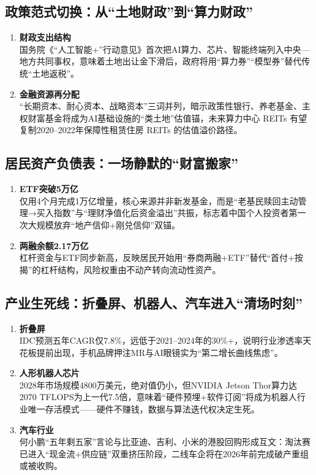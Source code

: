 \subsection{政策范式切换：从“土地财政”到“算力财政”}
\begin{enumerate}[leftmargin=*, nosep]
    \item \textbf{财政支出结构}  \\
    国务院《“人工智能+”行动意见》首次把AI算力、芯片、智能终端列入中央—地方共同事权，意味着土地出让金下滑后，政府将用“算力券”“模型券”替代传统“土地返税”。  
    \item \textbf{金融资源再分配}  \\
    “长期资本、耐心资本、战略资本”三词并列，暗示政策性银行、养老基金、主权财富基金将成为AI基础设施的“类土地”估值锚，未来算力中心 REITs 有望复制2020–2022年保障性租赁住房 REITs 的估值溢价路径。
\end{enumerate}

\subsection{居民资产负债表：一场静默的“财富搬家”}
\begin{enumerate}[leftmargin=*, nosep]
    \item \textbf{ETF突破5万亿}  \\
    仅用4个月完成1万亿增量，核心来源并非新发基金，而是“老基民赎回主动管理→买入指数”与“理财净值化后资金溢出”共振，标志着中国个人投资者第一次大规模放弃“地产信仰+刚兑信仰”双锚。  
    \item \textbf{两融余额2.17万亿}  \\
    杠杆资金与ETF同步新高，反映居民开始用“券商两融+ETF”替代“首付+按揭”的杠杆结构，风险权重由不动产转向流动性资产。
\end{enumerate}

\subsection{产业生死线：折叠屏、机器人、汽车进入“清场时刻”}
\begin{enumerate}[leftmargin=*, nosep]
    \item \textbf{折叠屏}  \\
    IDC预测五年CAGR仅7.8\%，远低于2021–2024年的30\%+，说明行业渗透率天花板提前出现，手机品牌押注MR与AI眼镜实为“第二增长曲线焦虑”。
    \item \textbf{人形机器人芯片}  \\
    2028年市场规模4800万美元，绝对值仍小，但NVIDIA Jetson Thor算力达2070 TFLOPS为上一代7.5倍，意味着“硬件预埋+软件订阅”将成为机器人行业唯一存活模式——硬件不赚钱，数据与算法迭代权决定生死。
    \item \textbf{汽车行业}  \\
    何小鹏“五年剩五家”言论与比亚迪、吉利、小米的港股回购形成互文：淘汰赛已进入“现金流+供应链”双重挤压阶段，二线车企将在2026年前完成破产重组或被收购。
\end{enumerate}

